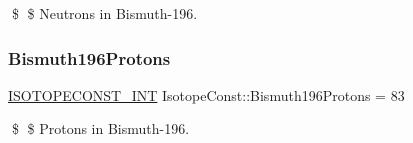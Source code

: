 \$ \$ Neutrons in Bismuth-\/196. \mbox{\label{group___isotope_const-_bismuth-_bi196_gae87582ea49120ceafc5a22f8429ff24a}} 
\subsubsection{\texorpdfstring{Bismuth196\+Protons}{Bismuth196Protons}}
{\footnotesize\ttfamily \mbox{\hyperlink{group___isotope_const-_macros_ga5f18360b3e99483a35c32d789e62621c}{I\+S\+O\+T\+O\+P\+E\+C\+O\+N\+S\+T\+\_\+\+I\+NT}} Isotope\+Const\+::\+Bismuth196\+Protons = 83}

\$ \$ Protons in Bismuth-\/196. 